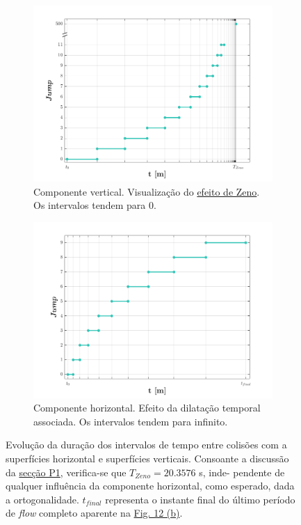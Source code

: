 \vspace{-2em}
\begin{figure}[H]
    \begin{subfigure}[b]{0.5\linewidth}
        \centering
        \includegraphics[width=1\linewidth]{img/P4/P4-zeno.png}
        \caption{Componente vertical. Visualização do \hyperref[def:zeno]{efeito de Zeno}. Os intervalos tendem para 0.} 
        \label{fig:P4-zeno} 
    \end{subfigure}%
    \begin{subfigure}[b]{0.5\linewidth}
        \centering
        \includegraphics[width=1\linewidth]{img/P4/P4-antizeno.png}
        \caption{Componente horizontal. Efeito da dilatação temporal associada. Os intervalos tendem para infinito.} 
        \label{fig:P4-antizeno} 
    \end{subfigure}%
    \caption{Evolução da duração dos intervalos de tempo entre colisões com a superfícies horizontal e superfícies verticais. Consoante a discussão da \hyperref[subsec:P1]{secção P1}, verifica-se que $T_{Zeno} =  20.3576$ s, inde- pendente de qualquer influência da componente horizontal, como esperado, dada a ortogonalidade. $t_{final}$ representa o instante final do último período de \textit{flow} completo aparente na \hyperref[fig:P4-y]{Fig. 12 (b)}.}
    \label{fig:P4-zenos}
\end{figure}
